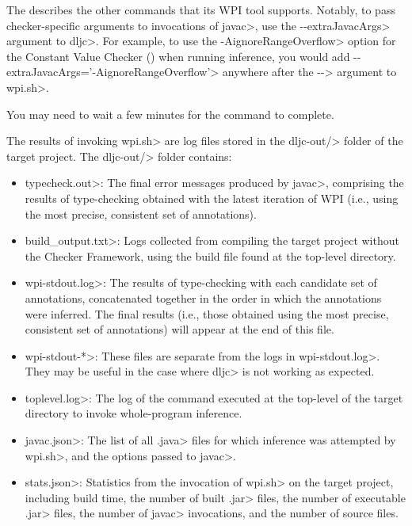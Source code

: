 \begin{description}
  The 
  describes the other commands that its WPI tool supports. Notably, to pass checker-specific
  arguments to invocations of \<javac>,
  use the \<-\relax-extraJavacArgs> argument to \<dljc>. For example, to use the \<-AignoreRangeOverflow>
  option for the Constant Value Checker () when running
  inference, you would add \<-\relax-extraJavacArgs='-AignoreRangeOverflow'> anywhere after the \<-\relax->
  argument to \<wpi.sh>.
\end{description}

You may need to wait a few minutes for the command to complete.


The results of invoking \<wpi.sh> are log files stored in the \<dljc-out/> folder
of the target project.
The \<dljc-out/> folder contains:

\begin{itemize}
\item \<typecheck.out>: The final error messages produced by \<javac>,
  comprising the results of type-checking obtained with the
  latest iteration of WPI (i.e., using the most precise, consistent set of
  annotations).
\item \<build\_output.txt>: Logs collected from compiling the target project
  without the Checker Framework, using the build file found at the
  top-level directory.
\item \<wpi-stdout.log>: The results of type-checking with each candidate set of
  annotations, concatenated together in the order in which the annotations
  were inferred.
  The final results (i.e., those obtained using the most precise, consistent
  set of annotations) will appear at the end of this file.
\item \<wpi-stdout-*>: These files are separate from the logs in \<wpi-stdout.log>.
  They may be useful in the case where \<dljc> is not working as expected.
\item \<toplevel.log>: The log of the command executed at the top-level of the
  target directory to invoke whole-program inference.
\item \<javac.json>: The list of all \<.java> files for which inference was
  attempted by \<wpi.sh>, and the options passed to \<javac>.
\item \<stats.json>: Statistics from the invocation of \<wpi.sh> on the target
  project, including build time, the number of built \<.jar> files, the number of
  executable \<.jar> files, the number of \<javac> invocations, and the number of
  source files.
\end{itemize}

